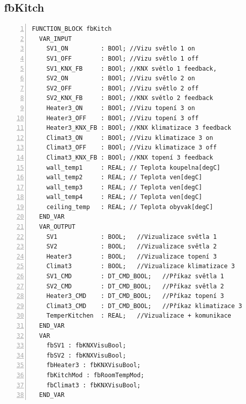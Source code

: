 \subsection{fbKitch}
\label{apend:fbKitch}
\begin{lstlisting}[language=ST, breaklines=true, numbers=left, numberstyle=\small, numbersep=10pt, frame=single, basicstyle=\ttfamily\small, caption={fbKitch}, label={lst:fbKitch}]
  FUNCTION_BLOCK fbKitch
  VAR_INPUT
    SV1_ON         : BOOl; //Vizu světlo 1 on
    SV1_OFF        : BOOl; //Vizu světlo 1 off
    SV1_KNX_FB     : BOOl; //KNX světlo 1 feedback,
    SV2_ON         : BOOl; //Vizu světlo 2 on
    SV2_OFF        : BOOl; //Vizu světlo 2 off
    SV2_KNX_FB     : BOOl; //KNX světlo 2 feedback
    Heater3_ON     : BOOl; //Vizu topení 3 on
    Heater3_OFF    : BOOl; //Vizu topení 3 off
    Heater3_KNX_FB : BOOl; //KNX klimatizace 3 feedback
    Climat3_ON     : BOOl; //Vizu klimatizace 3 on
    Climat3_OFF    : BOOl; //Vizu klimatizace 3 off
    Climat3_KNX_FB : BOOl; //KNX topení 3 feedback
    wall_temp1     : REAL; // Teplota koupelna[degC]
    wall_temp2     : REAL; // Teplota ven[degC]
    wall_temp3     : REAL; // Teplota ven[degC]
    wall_temp4     : REAL; // Teplota ven[degC]
    ceiling_temp   : REAL; // Teplota obyvak[degC]
  END_VAR
  VAR_OUTPUT
    SV1            : BOOL;   //Vizualizace světla 1
    SV2            : BOOL;   //Vizualizace světla 2
    Heater3        : BOOL;   //Vizualizace topení 3
    Climat3        : BOOL;   //Vizualizace klimatizace 3
    SV1_CMD        : DT_CMD_BOOL;   //Příkaz světla 1
    SV2_CMD        : DT_CMD_BOOL;   //Příkaz světla 2
    Heater3_CMD    : DT_CMD_BOOL;   //Příkaz topení 3
    Climat3_CMD    : DT_CMD_BOOL;   //Příkaz klimatizace 3
    TemperKitchen  : REAL;   //Vizualizace + komunikace
  END_VAR
  VAR
    fbSV1 : fbKNXVisuBool;
    fbSV2 : fbKNXVisuBool;
    fbHeater3 : fbKNXVisuBool;
    fbKitchMod : fbRoomTempMod;
    fbClimat3 : fbKNXVisuBool;
  END_VAR
\end{lstlisting}
\pagebreak
